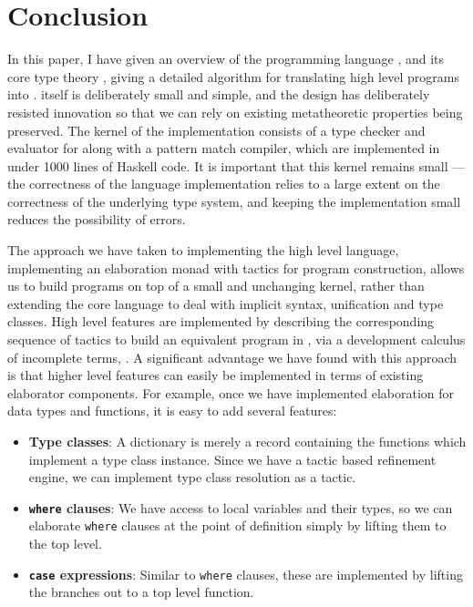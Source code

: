 

\section{Conclusion}

\label{sect:conclusion}

In this paper, I have given an overview of the programming language \Idris{},
and its core type theory \TT{}, giving a detailed algorithm for translating
high level programs into \TT{}.
\TT{} itself is deliberately small and simple, and the design has deliberately
resisted innovation so that we can rely on existing metatheoretic properties
being preserved. The kernel of the \Idris{} implementation consists of a type checker
and evaluator for \TT{} along with a pattern match compiler, which are implemented
in under 1000 lines of Haskell code. It is important that this kernel remains small
--- the correctness of the language implementation relies to a large extent on
the correctness of the underlying type system, and keeping the implementation small
reduces the possibility of errors.

The approach we have taken to implementing the high level language,
implementing an elaboration monad with tactics for program construction, allows
us to build programs on top of a small and unchanging kernel, rather than
extending the core language to deal with implicit syntax, unification and type
classes.  High level \Idris{} features are implemented by describing the
corresponding sequence of tactics to build an equivalent program in \TT{}, via
a development calculus of incomplete terms, \TTdev{}. A significant advantage
we have found with this approach is that higher level features can easily be
implemented in terms of existing elaborator components. For example, once we
have implemented elaboration for data types and functions, it is easy to add
several features:

\begin{itemize}
\item \textbf{Type classes}: A dictionary is merely a record containing the
functions which implement a type class instance. Since we have a tactic based
refinement engine, we can implement type class resolution as a tactic.
\item \textbf{\texttt{where} clauses}: We have access to local variables and
their types, so we can
elaborate \texttt{where} clauses at the point of definition simply by lifting
them to the top level. 
\item \textbf{\texttt{case} expressions}: Similar to \texttt{where} clauses,
these are implemented by lifting the branches out to a top level function.
\end{itemize}

